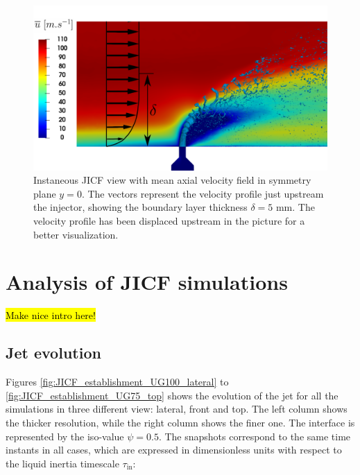 \begin{figure}[ht]
\centering
\includegraphics[scale=0.2]{./part2_developments/figures_ch5_resolved_JICF/Umean_profile_with_jet_in_BL}
\caption[Instaneous JICF view with mean axial velocity field in symmetry plane $y = 0$]{Instaneous JICF view with mean axial velocity field in symmetry plane $y = 0$. The vectors represent the velocity profile just upstream the injector, showing the boundary layer thickness $\delta = 5$ mm. The velocity profile has been displaced upstream in the picture for a better visualization.}
\label{fig:Umean_profile_with_jet}
\end{figure}



\clearpage

\section{Analysis of JICF simulations}

\hl{Make nice intro here!}

\subsection{Jet evolution}
\label{subsec:ch5_jet_evolution}





Figures \ref{fig:JICF_establishment_UG100_lateral} to \ref{fig:JICF_establishment_UG75_top} shows the evolution of the jet for all the simulations in three different view: lateral, front and top. The left column shows the thicker resolution, while the right column shows the finer one. The interface is represented by the iso-value $\psi = 0.5$. The snapshots correspond to the same time instants in all cases, which are expressed in dimensionless units with respect to the liquid inertia timescale $\tau_\mathrm{in}$:

